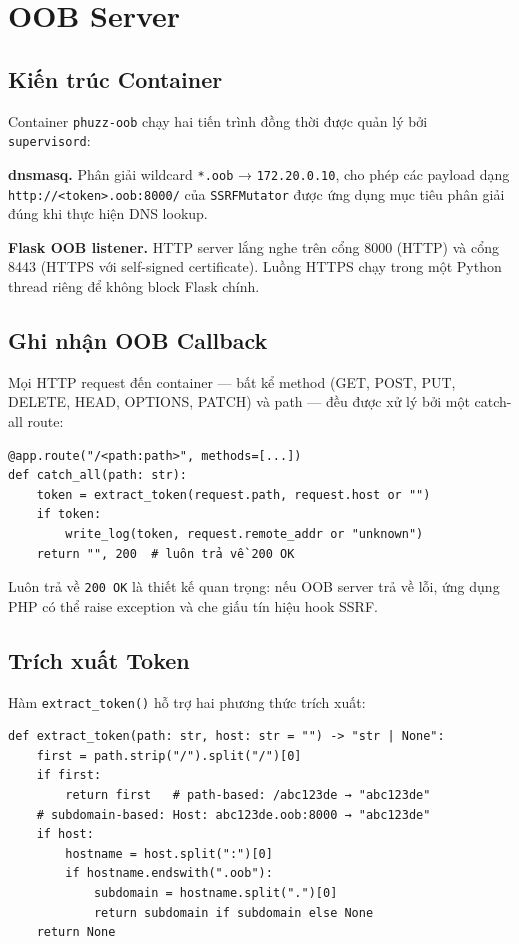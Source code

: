 \section{OOB Server}
\label{sec:oob-impl}

\subsection{Kiến trúc Container}

Container \texttt{phuzz-oob} chạy hai tiến trình đồng thời được quản lý
bởi \texttt{supervisord}:

\textbf{dnsmasq.} Phân giải wildcard \texttt{*.oob} → \texttt{172.20.0.10},
cho phép các payload dạng \texttt{http://<token>.oob:8000/} của
\texttt{SSRFMutator} được ứng dụng mục tiêu phân giải đúng khi thực hiện
DNS lookup.

\textbf{Flask OOB listener.} HTTP server lắng nghe trên cổng 8000 (HTTP)
và cổng 8443 (HTTPS với self-signed certificate). Luồng HTTPS chạy trong
một Python thread riêng để không block Flask chính.

\subsection{Ghi nhận OOB Callback}

Mọi HTTP request đến container --- bất kể method (GET, POST, PUT, DELETE,
HEAD, OPTIONS, PATCH) và path --- đều được xử lý bởi một catch-all route:

\begin{verbatim}
@app.route("/<path:path>", methods=[...])
def catch_all(path: str):
    token = extract_token(request.path, request.host or "")
    if token:
        write_log(token, request.remote_addr or "unknown")
    return "", 200  # luôn trả về 200 OK
\end{verbatim}

Luôn trả về \texttt{200 OK} là thiết kế quan trọng: nếu OOB server trả về
lỗi, ứng dụng PHP có thể raise exception và che giấu tín hiệu hook SSRF.

\subsection{Trích xuất Token}

Hàm \texttt{extract\_token()} hỗ trợ hai phương thức trích xuất:

\begin{verbatim}
def extract_token(path: str, host: str = "") -> "str | None":
    first = path.strip("/").split("/")[0]
    if first:
        return first   # path-based: /abc123de → "abc123de"
    # subdomain-based: Host: abc123de.oob:8000 → "abc123de"
    if host:
        hostname = host.split(":")[0]
        if hostname.endswith(".oob"):
            subdomain = hostname.split(".")[0]
            return subdomain if subdomain else None
    return None
\end{verbatim}


